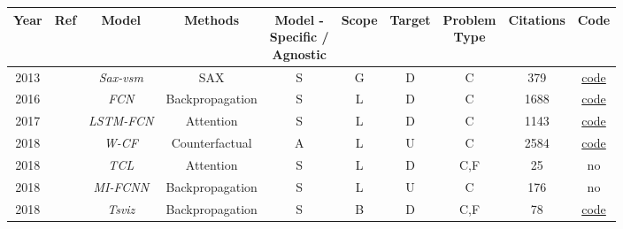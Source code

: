 \begin{table*}[h!]
  \centering
  \begin{tabular}{@{}cccccccccc@{}}
    \toprule
    Year        &   Ref                         & Model             & Methods       & \makecell{ Model - \\ Specific / \\ Agnostic}   & Scope         & Target  & \makecell{ Problem \\ Type }                       & Citations         & Code \\
    \midrule

    2013        & \cite{senin_sax-vsm_2013}             &\textit{Sax-vsm}   & SAX           & S      & G        & D      & C                    & 379               & \href{https://github.com/jMotif/sax-vsm_classic}{code}\\ 
    
    2016        &   \cite{wang_time_2016}        & \textit{FCN}      & Backpropagation     & S      & L         & D      & C                    & 1688              & \href{https://github.com/cauchyturing/UCR_Time_Series_Classification_Deep_Learning_Baseline}{code}\\ 

    2017        & \cite{karim_multivariate_2019}             &\textit{\footnotesize{LSTM-FCN}} & Attention     &S       & L         & D      & C                    & 1143              & \href{https://github.com/houshd/LSTM-FCN}{code}\\ 

    2018        & \cite{wachter_counterfactual_2018} & \textit{W-CF} & Counterfactual    & A      & L         & U      & C & 2584 & \href{https://github.com/e-delaney/Instance-Based_CFE_TSC/tree/main/W-CF}{code}\\

    2018        & \cite{vinayavekhin_focusing_2018} &\textit{TCL}& Attention &S        & L         & D      & C,F                           & 25                & no\\  

    2018        & \cite{strodthoff_detecting_2019}  &\textit{\footnotesize{MI-FCNN}}   & Backpropagation     &S       & L         & U   & C                    & 176               & no\\ 

    2018        & \cite{siddiqui_tsviz_2019}       &\textit{Tsviz}     & Backpropagation     &S       & B          & D      & C,F                    & 78                & \href{https://github.com/shoaibahmed/TSViz-Core}{code}\\


\end{tabular}
\end{table*}
